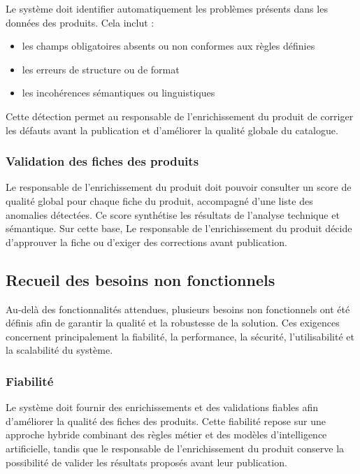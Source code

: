 Le système doit identifier automatiquement les problèmes présents dans les données des produits. Cela inclut :

\begin{itemize}
    \item les champs obligatoires absents ou non conformes aux règles définies 
    \item les erreurs de structure ou de format 
    \item les incohérences sémantiques ou linguistiques 
\end{itemize}

Cette détection permet au responsable de l'enrichissement du produit de corriger les défauts avant la publication et d'améliorer la qualité globale du catalogue.

\subsubsection{Validation des fiches des produits}

Le responsable de l'enrichissement du produit doit pouvoir consulter un score de qualité global pour chaque fiche du produit, accompagné d'une liste des anomalies détectées. Ce score synthétise les résultats de l'analyse technique et sémantique. Sur cette base, Le responsable de l'enrichissement du produit décide d'approuver la fiche ou d'exiger des corrections avant publication.

\subsection{Recueil des besoins non fonctionnels}

Au-delà des fonctionnalités attendues, plusieurs besoins non fonctionnels ont été définis afin de garantir la qualité et la robustesse de la solution. Ces exigences concernent principalement la fiabilité, la performance, la sécurité, l'utilisabilité et la scalabilité du système.

\subsubsection{Fiabilité}

Le système doit fournir des enrichissements et des validations fiables afin d'améliorer la qualité des fiches des produits. Cette fiabilité repose sur une approche hybride combinant des règles métier et des modèles d'intelligence artificielle, tandis que le responsable de l'enrichissement du produit conserve la possibilité de valider les résultats proposés avant leur publication.
\newpage
